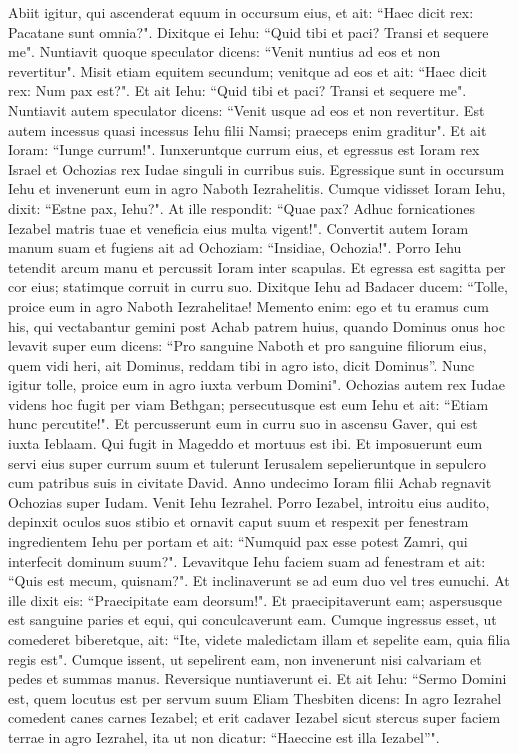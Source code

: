 \begin{biblechapter}
\verse Abiit igitur, qui ascenderat equum in occursum eius, et ait: “Haec dicit rex: Pacatane sunt omnia?". Dixitque ei Iehu: “Quid tibi et paci? Transi et sequere me". Nuntiavit quoque speculator dicens: “Venit nuntius ad eos et non revertitur". 
\verse Misit etiam equitem secundum; venitque ad eos et ait: “Haec dicit rex: Num pax est?". Et ait Iehu: “Quid tibi et paci? Transi et sequere me". 
\verse Nuntiavit autem speculator dicens: “Venit usque ad eos et non revertitur. Est autem incessus quasi incessus Iehu filii Namsi; praeceps enim graditur". 
\verse Et ait Ioram: “Iunge currum!". Iunxeruntque currum eius, et egressus est Ioram rex Israel et Ochozias rex Iudae singuli in curribus suis. Egressique sunt in occursum Iehu et invenerunt eum in agro Naboth Iezrahelitis. 
\verse Cumque vidisset Ioram Iehu, dixit: “Estne pax, Iehu?". At ille respondit: “Quae pax? Adhuc fornicationes Iezabel matris tuae et veneficia eius multa vigent!". 
\verse Convertit autem Ioram manum suam et fugiens ait ad Ochoziam: “Insidiae, Ochozia!". 
\verse Porro Iehu tetendit arcum manu et percussit Ioram inter scapulas. Et egressa est sagitta per cor eius; statimque corruit in curru suo. 
\verse Dixitque Iehu ad Badacer ducem: “Tolle, proice eum in agro Naboth Iezrahelitae! Memento enim: ego et tu eramus cum his, qui vectabantur gemini post Achab patrem huius, quando Dominus onus hoc levavit super eum dicens:  
\verse “Pro sanguine Naboth et pro sanguine filiorum eius, quem vidi heri, ait Dominus, reddam tibi in agro isto, dicit Dominus”. Nunc igitur tolle, proice eum in agro iuxta verbum Domini". 
\verse Ochozias autem rex Iudae videns hoc fugit per viam Bethgan; persecutusque est eum Iehu et ait: “Etiam hunc percutite!". Et percusserunt eum in curru suo in ascensu Gaver, qui est iuxta Ieblaam. Qui fugit in Mageddo et mortuus est ibi.  
\verse Et imposuerunt eum servi eius super currum suum et tulerunt Ierusalem sepelieruntque in sepulcro cum patribus suis in civitate David. 
\verse Anno undecimo Ioram filii Achab regnavit Ochozias super Iudam. 
\verse Venit Iehu Iezrahel. Porro Iezabel, introitu eius audito, depinxit oculos suos stibio et ornavit caput suum et respexit per fenestram 
\verse ingredientem Iehu per portam et ait: “Numquid pax esse potest Zamri, qui interfecit dominum suum?". 
\verse Levavitque Iehu faciem suam ad fenestram et ait: “Quis est mecum, quisnam?". Et inclinaverunt se ad eum duo vel tres eunuchi. 
\verse At ille dixit eis: “Praecipitate eam deorsum!". Et praecipitaverunt eam; aspersusque est sanguine paries et equi, qui conculcaverunt eam. 
\verse Cumque ingressus esset, ut comederet biberetque, ait: “Ite, videte maledictam illam et sepelite eam, quia filia regis est". 
\verse Cumque issent, ut sepelirent eam, non invenerunt nisi calvariam et pedes et summas manus. 
\verse Reversique nuntiaverunt ei. Et ait Iehu: “Sermo Domini est, quem locutus est per servum suum Eliam Thesbiten dicens: In agro Iezrahel comedent canes carnes Iezabel; 
\verse et erit cadaver Iezabel sicut stercus super faciem terrae in agro Iezrahel, ita ut non dicatur: “Haeccine est illa Iezabel”". 
\end{biblechapter}

